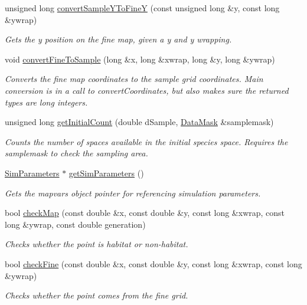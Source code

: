\begin{DoxyCompactItemize}
unsigned long \hyperlink{class_landscape_a20bce25a388ec094f4c3fa8600c22545}{convert\+Sample\+Y\+To\+FineY} (const unsigned long \&y, const long \&ywrap)
\begin{DoxyCompactList}\small\item\em Gets the y position on the fine map, given a y and y wrapping. \end{DoxyCompactList}\item 
void \hyperlink{class_landscape_a33e5909b7d430caf0f4fb909ba3e0499}{convert\+Fine\+To\+Sample} (long \&x, long \&xwrap, long \&y, long \&ywrap)
\begin{DoxyCompactList}\small\item\em Converts the fine map coordinates to the sample grid coordinates. Main conversion is in a call to convert\+Coordinates, but also makes sure the returned types are long integers. \end{DoxyCompactList}\item 
unsigned long \hyperlink{class_landscape_ae8d533d9a8fff3a96c240aadaeac3f04}{get\+Initial\+Count} (double d\+Sample, \hyperlink{class_data_mask}{Data\+Mask} \&samplemask)
\begin{DoxyCompactList}\small\item\em Counts the number of spaces available in the initial species space. Requires the samplemask to check the sampling area. \end{DoxyCompactList}\item 
\hyperlink{struct_sim_parameters}{Sim\+Parameters} $\ast$ \hyperlink{class_landscape_a679bb7a577f9404093b5aa8d17ba049e}{get\+Sim\+Parameters} ()
\begin{DoxyCompactList}\small\item\em Gets the mapvars object pointer for referencing simulation parameters. \end{DoxyCompactList}\item 
bool \hyperlink{class_landscape_a24de83f1e8f762b9640cdba35793a404}{check\+Map} (const double \&x, const double \&y, const long \&xwrap, const long \&ywrap, const double generation)
\begin{DoxyCompactList}\small\item\em Checks whether the point is habitat or non-\/habitat. \end{DoxyCompactList}\item 
bool \hyperlink{class_landscape_a0545765b734539f622804bb3aa72e38c}{check\+Fine} (const double \&x, const double \&y, const long \&xwrap, const long \&ywrap)
\begin{DoxyCompactList}\small\item\em Checks whether the point comes from the fine grid. \end{DoxyCompactList}\item 

\end{DoxyCompactItemize}
